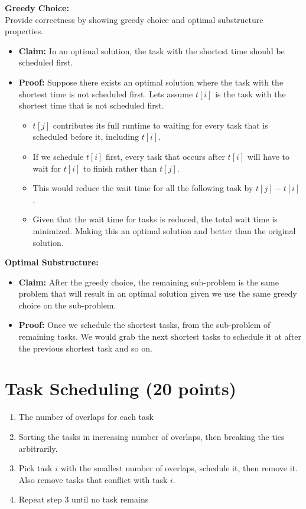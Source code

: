 \documentclass{article}[12pt]
\begin{document}
\noindent\textbf{Greedy Choice:} \\

  Provide correctness by showing greedy choice and optimal substructure properties.
    \begin{itemize}
      \item \textbf{Claim:} In an optimal solution, the task with the shortest time should be scheduled first.
      \item \textbf{Proof:} Suppose there exists an optimal solution where the task with the shortest time is not scheduled first.
        Lets assume $t[i]$ is the task with the shortest time that is not scheduled first.
        \begin{itemize}
          \item $t[j]$ contributes its full runtime to waiting for every task that is scheduled before it, including $t[i]$.
          \item If we schedule $t[i]$ first, every task that occurs after $t[i]$ 
            will have to wait for $t[i]$ to finish rather than $t[j]$.
          \item This would reduce the wait time for all the following task by $t[j] - t[i]$.
          \item Given that the wait time for tasks is reduced, the total wait time is minimized. Making this an optimal solution and better
            than the original solution.
        \end{itemize}
    \end{itemize}

\noindent\textbf{Optimal Substructure:} \\
\begin{itemize}
  \item \textbf{Claim:} After the greedy choice, the remaining sub-problem is the 
    same problem that will result in an optimal solution given we use the same greedy choice on the sub-problem.
  \item \textbf{Proof:} Once we schedule the shortest tasks, from the sub-problem of remaining tasks.
    We would grab the next shortest tasks to schedule it at after the previous shortest task and so on.
\end{itemize}

\newpage
\section{Task Scheduling (20 points)}
\begin{enumerate}
  \item The number of overlaps for each task
  \item Sorting the tasks in increasing number of overlaps, then breaking the ties arbitrarily.
  \item Pick task $i$ with the smallest number of overlaps, schedule it, then remove it. Also remove tasks that conflict with task $i$.
  \item Repeat step 3 until no task remains
\end{enumerate}
\end{document}
